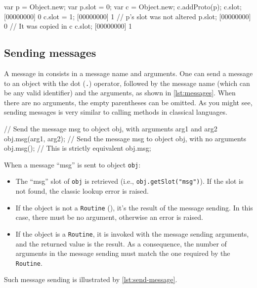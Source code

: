 \begin{urbiscript}[caption=Copy on write, label=lst:copy-on-write,
  float=\floatpos]
  var p = Object.new;
  var p.slot = 0;
  var c = Object.new;
  c.addProto(p);
  c.slot;
  [00000000] 0
  c.slot = 1;
  [00000000] 1
  // p's slot was not altered
  p.slot;
  [00000000] 0
  // It was copied in c
  c.slot;
  [00000000] 1
\end{urbiscript}

\subsection{Sending messages}

A message in \us consists in a message name and arguments. One can
send a message to an object with the dot (\lstinline|.|) operator,
followed by the message name (which can be any valid identifier) and
the arguments, as shown in \autoref{lst:messages}. When there are no
arguments, the empty parentheses can be omitted. As you might see,
sending messages is very similar to calling methods in classical
languages.

\begin{urbiscript}[caption=Sending messages, label=lst:messages,
  float=\floatpos]
  // Send the message msg to object obj, with arguments arg1 and arg2
  obj.msg(arg1, arg2);
  // Send the message msg to object obj, with no arguments
  obj.msg();
  // This is strictly equivalent
  obj.msg;
\end{urbiscript}

When a message ``msg'' is sent to object \lstinline|obj|:

\begin{itemize}
\item The ``msg'' slot of \lstinline|obj| is retrieved (i.e.,
  \lstinline|obj.getSlot("msg")|). If the slot is not found, the
  classic lookup error is raised.
\item If the object is not a \lstinline|Routine| (), it's
  the result of the message sending. In this case, there must be no
  argument, otherwise an error is raised.
\item If the object is a \lstinline|Routine|, it is invoked with the
  message sending arguments, and the returned value is the result. As
  a consequence, the number of arguments in the message sending must
  match the one required by the \lstinline|Routine|.
\end{itemize}

Such message sending is illustrated by \autoref{lst:send-message}.

